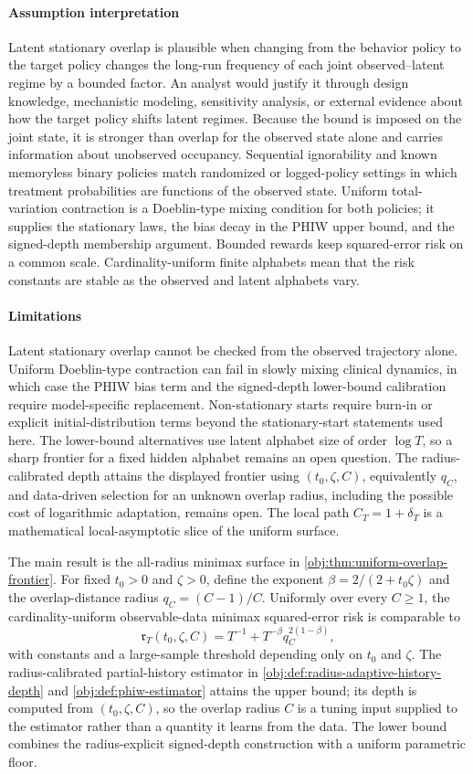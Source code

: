 \documentclass[11pt]{article}
\begin{document}
\paragraph{Assumption interpretation}
Latent stationary overlap is plausible when changing from the behavior policy to the target policy changes the long-run frequency of each joint observed--latent regime by a bounded factor. An analyst would justify it through design knowledge, mechanistic modeling, sensitivity analysis, or external evidence about how the target policy shifts latent regimes. Because the bound is imposed on the joint state, it is stronger than overlap for the observed state alone and carries information about unobserved occupancy. Sequential ignorability and known memoryless binary policies match randomized or logged-policy settings in which treatment probabilities are functions of the observed state. Uniform total-variation contraction is a Doeblin-type mixing condition for both policies; it supplies the stationary laws, the bias decay in the PHIW upper bound, and the signed-depth membership argument. Bounded rewards keep squared-error risk on a common scale. Cardinality-uniform finite alphabets mean that the risk constants are stable as the observed and latent alphabets vary.

\paragraph{Limitations}
Latent stationary overlap cannot be checked from the observed trajectory alone. Uniform Doeblin-type contraction can fail in slowly mixing clinical dynamics, in which case the PHIW bias term and the signed-depth lower-bound calibration require model-specific replacement. Non-stationary starts require burn-in or explicit initial-distribution terms beyond the stationary-start statements used here. The lower-bound alternatives use latent alphabet size of order \(\log T\), so a sharp frontier for a fixed hidden alphabet remains an open question. The radius-calibrated depth attains the displayed frontier using \((t_0,\zeta,C)\), equivalently \(q_C\), and data-driven selection for an unknown overlap radius, including the possible cost of logarithmic adaptation, remains open. The local path \(C_T=1+\delta_T\) is a mathematical local-asymptotic slice of the uniform surface.

The main result is the all-radius minimax surface in \cref{obj:thm:uniform-overlap-frontier}. For fixed \(t_0>0\) and \(\zeta>0\), define the exponent \(\beta=2/(2+t_0\zeta)\) and the overlap-distance radius \(q_C=(C-1)/C\). Uniformly over every \(C\ge1\), the cardinality-uniform observable-data minimax squared-error risk is comparable to
\[
\mathfrak r_T(t_0,\zeta,C)
=
T^{-1}+T^{-\beta}q_C^{2(1-\beta)},
\]
with constants and a large-sample threshold depending only on \(t_0\) and \(\zeta\). The radius-calibrated partial-history estimator in \cref{obj:def:radius-adaptive-history-depth} and \cref{obj:def:phiw-estimator} attains the upper bound; its depth is computed from \((t_0,\zeta,C)\), so the overlap radius \(C\) is a tuning input supplied to the estimator rather than a quantity it learns from the data. The lower bound combines the radius-explicit signed-depth construction with a uniform parametric floor.
\end{document}
